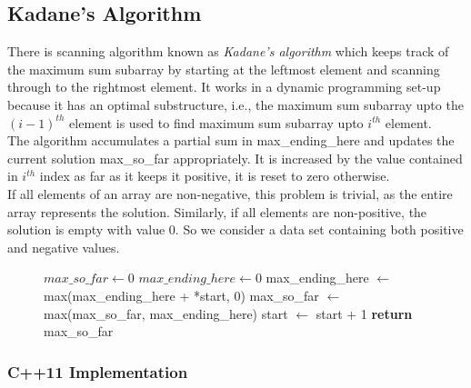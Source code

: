 \begin{center}
\end{center}


\subsection{Kadane\rq{}s Algorithm}
There is scanning algorithm known as \textit{Kadane\rq{}s algorithm} which keeps track of the maximum sum subarray by starting at the leftmost element and scanning through to the rightmost element. It works in a dynamic programming set-up because it has an optimal substructure, i.e., the maximum sum subarray upto the $(i - 1)^{th}$ element is used to find maximum sum subarray upto $i^{th}$ element. 
\vspace{1mm}\\
The algorithm accumulates a partial sum in max\_ending\_here and updates the current solution max\_so\_far appropriately. It is increased by the value contained in $i^{th}$ index as far as it keeps it positive, it is reset to zero otherwise.\\
If all elements of an array are non-negative, this problem is trivial, as the entire array represents the solution. Similarly, if all elements are non-positive, the solution is empty with value 0. So we consider a data set containing both positive and negative values.

\begin{figure}[H]
\begin{center}
\end{center}
\begin{algorithmic}[1]
    \State $max\_so\_far \gets 0$
    \State $max\_ending\_here \gets 0$
             \State max\_ending\_here  $\gets$ max(max\_ending\_here + *start, 0)
            \State max\_so\_far  $\gets$ max(max\_so\_far, max\_ending\_here)
            \State start $\gets$ start + 1
        \EndWhile
    \State \textbf{return} max\_so\_far
\EndFunction
\end{algorithmic}
\end{figure}

\subsubsection{C++11 Implementation}


